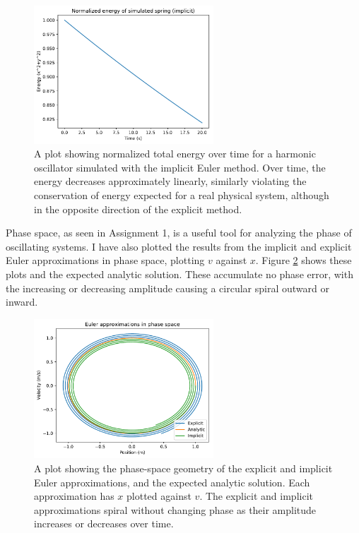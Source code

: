 \documentclass{article}
\begin{document}
\begin{figure}[H]
	\centering
	\includegraphics[width=0.6\textwidth]{eulerimplicitenergy.pdf}
	\caption{A plot showing normalized total energy over time for a harmonic oscillator simulated with the implicit Euler method. Over time, the energy decreases approximately linearly, similarly violating the conservation of energy expected for a real physical system, although in the opposite direction of the explicit method.}
	\label{implicitenergy}
\end{figure}

Phase space, as seen in Assignment 1, is a useful tool for analyzing the phase of oscillating systems. I have also plotted the results from the implicit and explicit Euler approximations in phase space, plotting $v$ against $x$. Figure \ref{phasespace} shows these plots and the expected analytic solution. These accumulate no phase error, with the increasing or decreasing amplitude causing a circular spiral outward or inward. 

\begin{figure}[H]
	\centering
	\includegraphics[width=0.6\textwidth]{eulerphasespace.pdf}
	\caption{A plot showing the phase-space geometry of the explicit and implicit Euler approximations, and the expected analytic solution. Each approximation has $x$ plotted against $v$. The explicit and implicit approximations spiral without changing phase as their amplitude increases or decreases over time.}
	\label{phasespace}
\end{figure}
\end{document}
